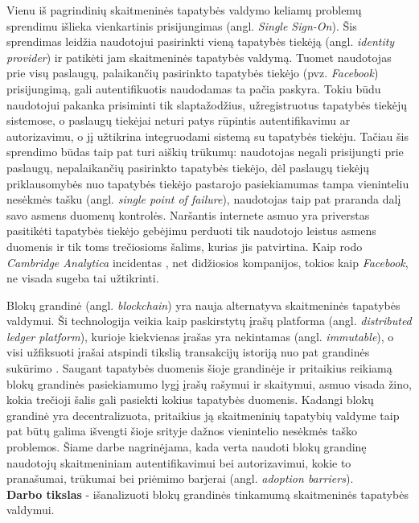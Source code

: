 Vienu iš pagrindinių skaitmeninės tapatybės valdymo keliamų problemų sprendimu išlieka vienkartinis prisijungimas
 (angl. \textit{Single Sign-On}). Šis sprendimas leidžia naudotojui pasirinkti
vieną tapatybės tiekėją (angl. \textit{identity provider}) ir patikėti jam skaitmeninės tapatybės valdymą. Tuomet naudotojas prie visų
paslaugų, palaikančių pasirinkto tapatybės tiekėjo (pvz. \textit{Facebook}) prisijungimą, gali autentifikuotis naudodamas ta pačia paskyra. Tokiu
būdu naudotojui pakanka prisiminti tik slaptažodžius, užregistruotus tapatybės tiekėjų sistemose, o paslaugų
tiekėjai neturi patys rūpintis autentifikavimu ar autorizavimu, o jį užtikrina integruodami sistemą
su tapatybės tiekėju. Tačiau šis sprendimo būdas taip pat turi aiškių trūkumų: naudotojas negali prisijungti
prie paslaugų, nepalaikančių pasirinkto tapatybės tiekėjo, dėl paslaugų tiekėjų priklausomybės nuo tapatybės tiekėjo pastarojo pasiekiamumas
tampa vieninteliu nesėkmės tašku (angl. \textit{single point of failure}), naudotojas taip pat praranda dalį savo asmens duomenų kontrolės.
Naršantis internete asmuo yra priverstas pasitikėti tapatybės tiekėjo
gebėjimu perduoti tik naudotojo leistus asmens duomenis ir tik toms trečiosioms šalims, kurias jis patvirtina.
Kaip rodo \textit{Cambridge Analytica} incidentas \cite{CambridgeAnalytica}, net didžiosios kompanijos, tokios
kaip \textit{Facebook}, ne visada sugeba tai užtikrinti.

Blokų grandinė (angl. \textit{blockchain}) yra nauja alternatyva skaitmeninės tapatybės valdymui. Ši technologija veikia kaip
paskirstytų įrašų platforma (angl. \textit{distributed ledger platform}), kurioje kiekvienas įrašas yra nekintamas (angl. \textit{immutable}), o visi
užfiksuoti įrašai atspindi tikslią transakcijų istoriją nuo pat grandinės sukūrimo \cite{Baars2016}. Saugant tapatybės duomenis šioje grandinėje ir
pritaikius reikiamą blokų grandinės pasiekiamumo lygį įrašų rašymui ir skaitymui, asmuo visada
žino, kokia trečioji šalis gali pasiekti kokius tapatybės duomenis. Kadangi blokų grandinė yra decentralizuota, pritaikius ją skaitmeninių tapatybių valdyme taip pat
būtų galima išvengti šioje srityje dažnos vienintelio nesėkmės taško problemos. Šiame darbe nagrinėjama, kada verta naudoti blokų grandinę
naudotojų skaitmeniniam autentifikavimui bei autorizavimui, kokie to pranašumai, trūkumai bei priėmimo barjerai (angl. \textit{adoption barriers}).
\\

\textbf{Darbo tikslas} - išanalizuoti blokų grandinės tinkamumą skaitmeninės tapatybės valdymui.
\\

